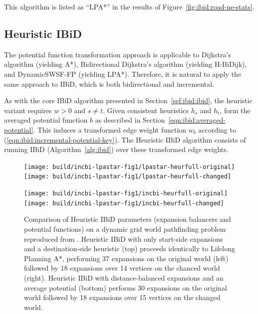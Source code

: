 This algorithm is listed as ``LPA*''
in the results of Figure~\ref{fig:ibid:road-ne-stats}.

\subsection{Heuristic IBiD}

The potential function transformation approach is
applicable to Dijkstra's algorithm (yielding A*),
Bidirectional Dijkstra's algorithm (yielding H-BiDijk),
and DynamicSWSF-FP (yielding LPA*).
Therefore,
it is natural to apply the same approach to IBiD,
which is both bidirectional and incremental.

As with the core IBiD algorithm presented in Section~\ref{sef:ibid:ibid},
the heuristic variant requires $w > 0$ and $s \neq t$.
Given consistent heuristics $h_s$ and $h_t$,
form the averaged potential function $b$ as described
in Section~\ref{eqn:ibid:averaged-potential}.
This induces a transformed edge weight function $w_b$
according to (\ref{eqn:ibid:incremental-potential-key}).
The Heuristic IBiD algorithm consists of running IBiD
(Algorithm~\ref{alg:ibid}) over these transformed edge weights.

\begin{figure}
   \centering%
   
   \texttt{[image: build/incbi-lpastar-fig1/lpastar-heurfull-original]}%
   \;\;%
   \texttt{[image: build/incbi-lpastar-fig1/lpastar-heurfull-changed]}%
   
   \vspace{0.2cm}
   
   \texttt{[image: build/incbi-lpastar-fig1/incbi-heurfull-original]}%
   \;\;%
   \texttt{[image: build/incbi-lpastar-fig1/incbi-heurfull-changed]}%
   
   \caption{
      Comparison of Heuristic IBiD parameters (expansion balancers
      and potential functions) on a dynamic grid world pathfinding
      problem reproduced from \citep{koenig2004lpastar}.
      Heuristic IBiD with only start-side expansions
      and a destination-side heuristic (top)
      proceeds identically to Lifelong Planning A*,
      performing 37 expansions on the original world (left)
      followed by 18 expansions over 14 vertices on the chanced
      world (right).
      Heuristic IBiD with distance-balanced expansions and an average
      potential (bottom)
      performs 30 expansions on the original world
      followed by 18 expansions over 15 vertices on the changed
      world.}
   \label{fig:incbi-lpastar-fig1}
\end{figure}

